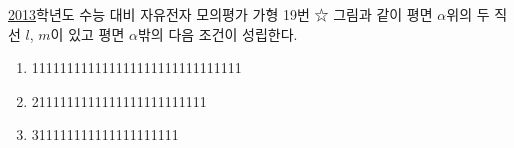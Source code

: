 \uline{2013}학년도 수능 대비 자유전자 모의평가 가형 19번 ☆
그림과 같이 평면 $\alpha$위의 두 직선 $l$, $m$이 있고 평면 $\alpha$밖의
다음 조건이 성립한다.

\begin{framed}

\begin{enumerate}[ㄱ.]
\item 111111111111111111111111111111
\item 2111111111111111111111111
\item 311111111111111111111

\end{enumerate}

\end{framed}
\vfill{}
\rule{0pt}{1mm}


